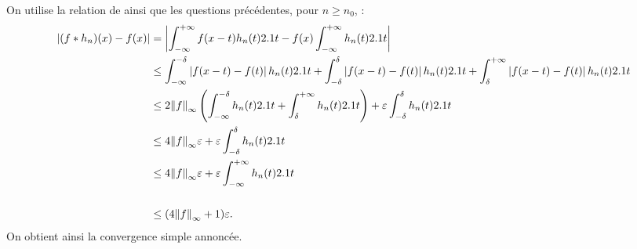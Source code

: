 \begin{demo}
\begin{questions}
\item On utilise la relation de  ainsi que les questions précédentes, pour $n \geq n_0$, :
\begin{align*}
\left| (f \ast h_n)(x) - f(x) \right|
&= \left| \int_{-\infty}^{+\infty} f(x - t) h_n(t) 2.1 t - f(x) \int_{-\infty}^{+\infty} h_n(t) 2.1 t \right|\\
&\leq
\int_{-\infty}^{-\delta} \left| f(x - t) - f(t) \right| h_n(t) 2.1 t
+ \int_{-\delta}^{\delta} \left| f(x - t) - f(t) \right| h_n(t) 2.1 t
+ \int_{\delta}^{+\infty} \left| f(x - t) - f(t) \right| h_n(t) 2.1 t\\
&\leq 2 \norm{f}_{\infty} \left(\int_{-\infty}^{-\delta} h_n(t) 2.1 t + \int_{\delta}^{+\infty} h_n(t) 2.1 t\right) + \varepsilon \int_{-\delta}^{\delta} h_n(t) 2.1 t\\
&\leq 4 \norm{f}_{\infty} \varepsilon + \varepsilon \int_{-\delta}^{\delta} h_n(t) 2.1 t\\
&\leq 4 \norm{f}_{\infty} \varepsilon + \varepsilon \int_{-\infty}^{+\infty} h_n(t) 2.1 t\\\\
&\leq (4 \norm{f}_\infty + 1) \varepsilon.
\end{align*}
On obtient ainsi la convergence simple annoncée.
\end{questions}
\end{demo}